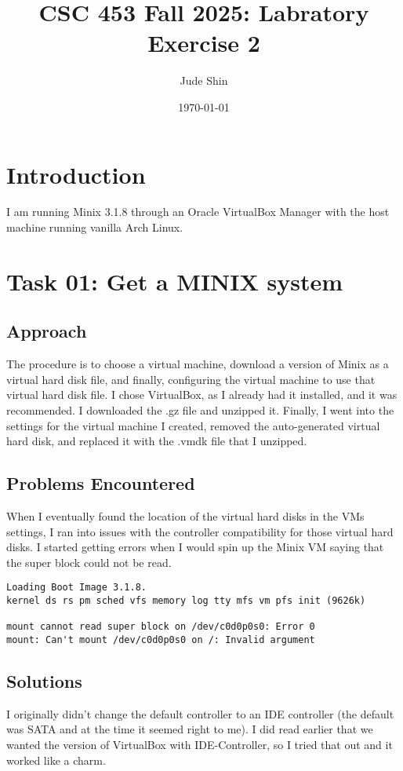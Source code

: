 \documentclass[11pt]{article}
\title{CSC 453 Fall 2025: Labratory Exercise 2}
\author{Jude Shin}
\date{\today}
\begin{document}
\section*{Introduction}
I am running Minix 3.1.8 through an Oracle VirtualBox Manager with the host machine running vanilla Arch Linux.

\section*{Task 01: Get a MINIX system}

\subsection*{Approach}
The procedure is to choose a virtual machine, download a version of Minix as a virtual hard disk file, and finally, configuring the virtual machine to use that virtual hard disk file. I chose VirtualBox, as I already had it installed, and it was recommended. I downloaded the .gz file and unzipped it. Finally, I went into the settings for the virtual machine I created, removed the auto-generated virtual hard disk, and replaced it with the .vmdk file that I unzipped. 

\subsection*{Problems Encountered}
When I eventually found the location of the virtual hard disks in the VMs settings, I ran into issues with the controller compatibility for those virtual hard disks. I started getting errors when I would spin up the Minix VM saying that the super block could not be read. 

\begin{verbatim}
Loading Boot Image 3.1.8.
kernel ds rs pm sched vfs memory log tty mfs vm pfs init (9626k)

mount cannot read super block on /dev/c0d0p0s0: Error 0
mount: Can't mount /dev/c0d0p0s0 on /: Invalid argument
\end{verbatim}

\subsection*{Solutions}
I originally didn't change the default controller to an IDE controller (the default was SATA and at the time it seemed right to me). I did read earlier that we wanted the version of VirtualBox with IDE-Controller, so I tried that out and it worked like a charm.
\end{document}
